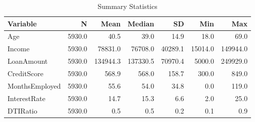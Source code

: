 \begin{table}
\caption{Summary Statistics}
\label{tab:summary_stats}
\begin{tabular}{lrrrrrr}
\toprule
Variable & N & Mean & Median & SD & Min & Max \\
\midrule
Age & 5930.0 & 40.5 & 39.0 & 14.9 & 18.0 & 69.0 \\
Income & 5930.0 & 78831.0 & 76708.0 & 40289.1 & 15014.0 & 149944.0 \\
LoanAmount & 5930.0 & 134944.3 & 137330.5 & 70970.4 & 5000.0 & 249929.0 \\
CreditScore & 5930.0 & 568.9 & 568.0 & 158.7 & 300.0 & 849.0 \\
MonthsEmployed & 5930.0 & 55.6 & 54.0 & 34.8 & 0.0 & 119.0 \\
InterestRate & 5930.0 & 14.7 & 15.3 & 6.6 & 2.0 & 25.0 \\
DTIRatio & 5930.0 & 0.5 & 0.5 & 0.2 & 0.1 & 0.9 \\
\bottomrule
\end{tabular}
\end{table}
